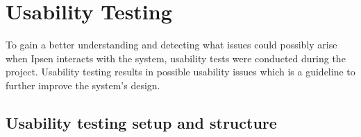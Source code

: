 \section{Usability Testing}

To gain a better understanding and detecting what issues could possibly arise when Ipsen interacts with the system, usability tests were conducted during the project. 
Usability testing results in possible usability issues which is a guideline to further improve the system's design. 

\subsection{Usability testing setup and structure}



  


